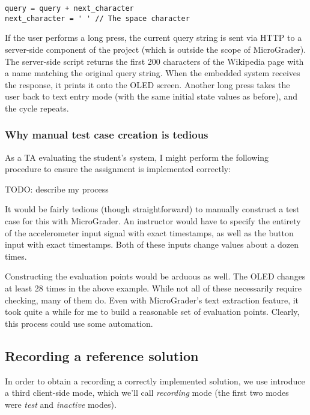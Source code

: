 \documentclass[12pt]{article}
\begin{document}
\begin{lstlisting}
query = query + next_character
next_character = ' ' // The space character
\end{lstlisting}

If the user performs a long press, the current query string is sent via HTTP to a server-side component of the project (which is outside the scope of MicroGrader).  The server-side script returns the first 200 characters of the Wikipedia page with a name matching the original query string.  When the embedded system receives the response, it prints it onto the OLED screen.  Another long press takes the user back to text entry mode (with the same initial state values as before), and the cycle repeats.

\subsubsection{Why manual test case creation is tedious}
As a TA evaluating the student's system, I might perform the following procedure to ensure the assignment is implemented correctly:

TODO: describe my process

It would be fairly tedious (though straightforward) to manually construct a test case for this with MicroGrader.  An instructor would have to specify the entirety of the accelerometer input signal with exact timestamps, as well as the button input with exact timestamps.  Both of these inputs change values about a dozen times.

Constructing the evaluation points would be arduous as well.  The OLED changes at least 28 times in the above example.  While not all of these necessarily require checking, many of them do.  Even with MicroGrader's text extraction feature, it took quite a while for me to build a reasonable set of evaluation points.   Clearly, this process could use some automation.

\subsection{Recording a reference solution}
In order to obtain a recording a correctly implemented solution, we use introduce a third client-side mode, which we'll call \textit{recording} mode (the first two modes were \textit{test} and \textit{inactive} modes). 
\end{document}
